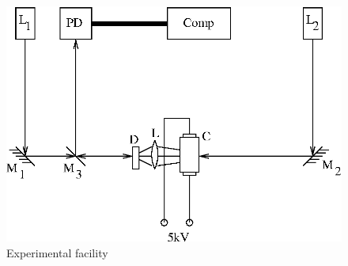 \begin{figure}
\begin{center}
\includegraphics{./exp_scheme.eps}
\end{center}
\caption{Experimental facility}
\label{fig:exp_scheme}
\end{figure}
